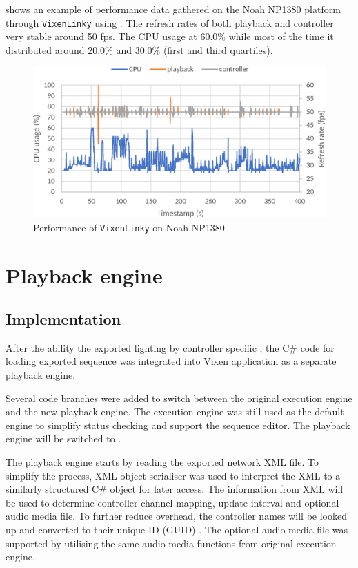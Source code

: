  shows an example of performance data gathered on the Noah NP1380 platform through \texttt{VixenLinky} using . The refresh rates of both playback and controller  very stable around  50 fps. The CPU usage  at $60.0 \%$\ca{,} while most of the time it  distributed around $20.0 \%$ and $30.0 \%$ (first and third quartiles).

\begin{figure}[!t]
  \centering
  \includegraphics[width=0.8\columnwidth]{Figs/vixenlinky_noah.eps}
  \caption{\footnotesize Performance of \texttt{VixenLinky} on Noah NP1380}
  \label{fig:vixenlinky_noah}
\end{figure}

\section{Playback engine}

\subsection{Implementation}

After  the ability  the exported lighting  by controller specific , the C\# code for loading exported sequence  was integrated into Vixen application as a separate playback engine.

Several code branches were added to switch between the original execution engine and the new playback engine. The execution engine was still used as the default engine to simplify status checking and support the sequence editor. The playback engine will be switched to .

The playback engine starts by reading the exported network XML file. To simplify the process,  XML object serialiser was used to interpret  the XML  to a similarly structured C\# object for later access. The information  from XML will be used to determine controller channel mapping, update interval and optional audio media file. To further reduce  overhead, the controller names will be looked up and converted to their unique ID (GUID) . The optional audio media file was supported by utilising the same audio media functions from original execution engine.

